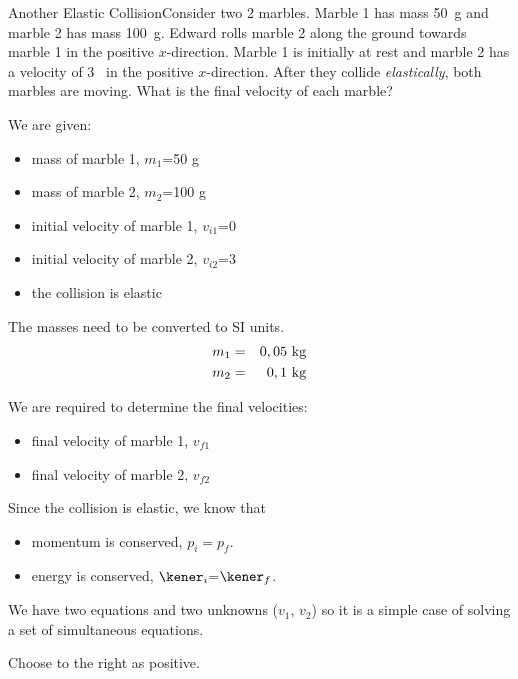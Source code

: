 \begin{wex}{Another Elastic Collision}{Consider two 2 marbles. Marble 1 has mass 50~g and marble 2 has mass 100~g. Edward rolls marble 2 along the ground towards marble 1 in the positive $x$-direction. Marble 1 is initially at rest and marble 2 has a velocity of 3 \ms\ in the positive $x$-direction. After they collide \emph{elastically}, both marbles are moving. What is the final velocity of each marble?}
{

We are given:
\begin{itemize}
\item mass of marble 1, $m_1$=50 g
\item mass of marble 2, $m_2$=100 g
\item initial velocity of marble 1, $v_{i1}$=0 \ms
\item initial velocity of marble 2, $v_{i2}$=3 \ms
\item the collision is elastic
\end{itemize}

The masses need to be converted to SI units.
\begin{eqnarray*}
m_{1} &=& 0,05\ \rm{kg}\\
m_{2} &=& 0,1\ \rm{kg}
\end{eqnarray*}

We are required to determine the final velocities:
\begin{itemize}
\item final velocity of marble 1, $v_{f1}$
\item final velocity of marble 2, $v_{f2}$
\end{itemize}

Since the collision is elastic, we know that
\begin{itemize}

\item momentum is conserved, $p_i=p_f$.
\item energy is conserved, $\kener_{i}$=$\kener_{f}$.
\end{itemize}

We have two equations and two unknowns ($v_1$, $v_2$) so it is a simple case of solving a set of simultaneous equations.

Choose to the right as positive.

}
\end{wex}
